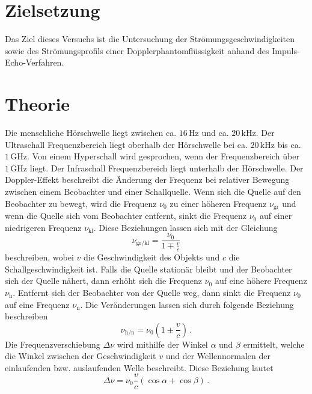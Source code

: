 \section{Zielsetzung}
\label{sec:Zielsetzung}
\nocite{anleitungUS3}
Das Ziel dieses Versuchs ist die Untersuchung der Strömungsgeschwindigkeiten sowie des Strömungsprofils einer Dopplerphantomflüssigkeit anhand 
des Impuls-Echo-Verfahren.

\section{Theorie}
\label{sec:Theorie}
Die menschliche Hörschwelle liegt zwischen ca. $16\,\unit{\hertz}$ und ca. $20\,\unit{\kilo\hertz}$. Der Ultraschall Frequenzbereich
liegt oberhalb der Hörschwelle bei ca. $20\,\unit{\kilo\hertz}$ bis ca. $1\,\unit{\giga\hertz}$. Von einem Hyperschall wird gesprochen, wenn
der Frequenzbereich über $1\,\unit{\giga\hertz}$ liegt. Der Infraschall Frequenzbereich liegt unterhalb der Hörschwelle. 
Der Doppler-Effekt beschreibt die Änderung der Frequenz bei relativer Bewegung zwischen einem Beobachter und einer Schallquelle. 
Wenn sich die Quelle auf den Beobachter zu bewegt, wird die Frequenz $\nu_0$ zu einer höheren Frequenz $\nu_{\text{gr}}$ und wenn die
Quelle sich vom Beobachter entfernt, sinkt die Frequenz $\nu_0$ auf einer niedrigeren Frequenz $\nu_{\text{kl}}$. Diese Beziehungen lassen sich mit
der Gleichung
\begin{equation}
    \nu_{\text{gr/kl}} = \frac{\nu_0}{1 \mp \frac{v}{c}}
    \label{eqn:Frequenz_Quelle-Beobachter}
\end{equation}
beschreiben, wobei $v$ die Geschwindigkeit des Objekts und $c$ die Schallgeschwindigkeit ist. Falls die Quelle stationär bleibt und der Beobachter sich der Quelle nähert, dann erhöht sich die Frequenz $\nu_0$ auf eine höhere Frequenz
$\nu_{\text{h}}$. Entfernt sich der Beobachter von der Quelle weg, dann sinkt die Frequenz $\nu_0$ auf eine Frequenz $\nu_{\text{n}}$. Die Veränderungen lassen sich
durch folgende Beziehung beschreiben 
\begin{equation}
    \nu_{\text{h/n}} = \nu_0 \left( 1 \pm \frac{v}{c}\right)\,.
    \label{eqn:Frequenz_Beobachter-Quelle}
\end{equation}
Die Frequenzverschiebung $\Delta \nu$ wird mithilfe der Winkel $\alpha$ und $\beta$ ermittelt, welche die Winkel zwischen der Geschwindigkeit $v$ und der
Wellennormalen der einlaufenden bzw. auslaufenden Welle beschreibt. Diese Beziehung lautet 
\begin{equation}
    \Delta \nu = \nu_0 \frac{v}{c} \left(\cos \alpha + \cos \beta\right)\,.
    \label{eqn:Frequenzverschiebung}
\end{equation}
